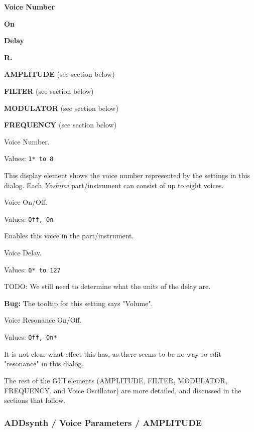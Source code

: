    \begin{enumber}
      \item \textbf{Voice Number}
      \item \textbf{On}
      \item \textbf{Delay}
      \item \textbf{R.}
      \item \textbf{AMPLITUDE} (see section below)
      \item \textbf{FILTER} (see section below)
      \item \textbf{MODULATOR} (see section below)
      \item \textbf{FREQUENCY} (see section below)
   \end{enumber}

   \setcounter{ItemCounter}{0}      %

   Voice Number.

   Values: \texttt{1* to 8}

   This display element shows the voice number represented by the settings
   in this dialog.  Each \textsl{Yoshimi} part/instrument can consist of up
   to eight voices.

   Voice On/Off.

   Values: \texttt{Off, On}

   Enables this voice in the part/instrument.

   Voice Delay.

   Values: \texttt{0* to 127}

TODO: We still need to determine what the units of the delay are.

   \textbf{Bug:}
   The tooltip for this setting says "Volume".

   Voice Resonance On/Off.

   Values: \texttt{Off, On*}

   It is not clear what effect this has, as there seems to be no way to edit
   "resonance" in this dialog.

   The rest of the GUI elements
   (AMPLITUDE, FILTER, MODULATOR, FREQUENCY, and Voice Oscillator)
   are more detailed, and discussed in the sections that follow.

\subsubsection{ADDsynth / Voice Parameters / AMPLITUDE}
\label{subsubsec:addsynth_voice_parameters_amplitude}

